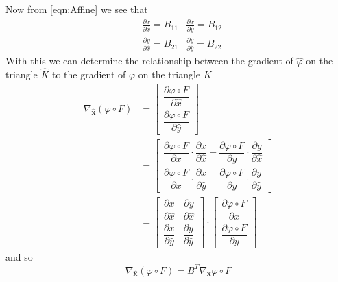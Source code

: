 Now from \eqref{eqn:Affine} we see that
\begin{align*}
  &\frac{\partial x}{\partial \hat{x}} = B_{11}   &\frac{\partial x}{\partial \hat{y}} = B_{12} \\
  &\frac{\partial y}{\partial \hat{x}} = B_{21}   &\frac{\partial y}{\partial \hat{y}} = B_{22}
\end{align*}
With this we can determine the relationship between the gradient of $\hat{\varphi}$ on the
triangle $\hat{K}$ to the gradient of $\varphi$ on the triangle $K$
\begin{align*}
  \nabla_{\mathbf{\hat{x}}}\left( \varphi \circ F \right) &= \begin{bmatrix}
    \dfrac{\partial \varphi\circ F}{\partial \hat{x}} \\[1em]
    \dfrac{\partial \varphi\circ F}{\partial \hat{y}}
  \end{bmatrix} \\
  &=\begin{bmatrix}
    \dfrac{\partial \varphi\circ F}{\partial x} \cdot \dfrac{\partial x}{\partial \hat{x}} +
      \dfrac{\partial \varphi\circ F}{\partial y} \cdot \dfrac{\partial y}{\partial \hat{x}} \\[1em]
    \dfrac{\partial \varphi\circ F}{\partial x} \cdot \dfrac{\partial x}{\partial \hat{y}} +
      \dfrac{\partial \varphi\circ F}{\partial y} \cdot \dfrac{\partial y}{\partial \hat{y}}
  \end{bmatrix} \\
  &= \begin{bmatrix}
    \dfrac{\partial x}{\partial \hat{x}} & \dfrac{\partial y}{\partial \hat{x}} \\[1em]
    \dfrac{\partial x}{\partial \hat{y}} & \dfrac{\partial y}{\partial \hat{y}}
  \end{bmatrix}\cdot \begin{bmatrix}
    \dfrac{\partial \varphi\circ F}{\partial x} \\[1em] \dfrac{\partial \varphi\circ F}{\partial y}
  \end{bmatrix}
\end{align*}
and so
\begin{equation}
  \nabla_{\mathbf{\hat{x}}}\left( \varphi \circ F \right) = B^T \nabla_{\mathbf{x}} \varphi \circ F
  \label{eqn:Gradient}
\end{equation}


